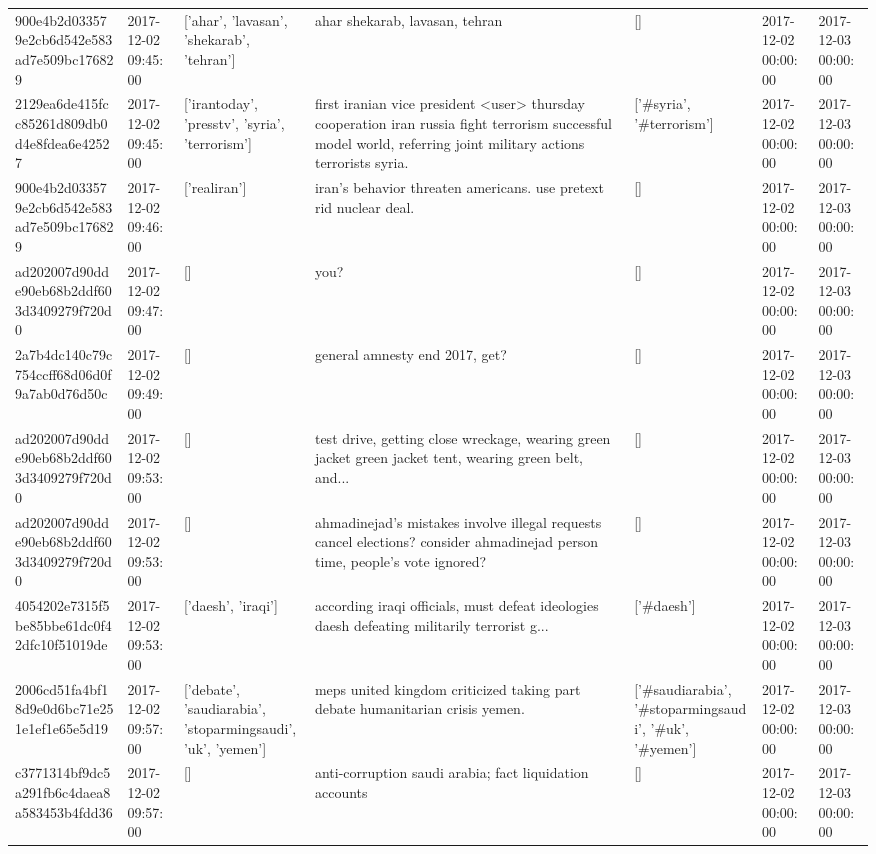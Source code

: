 \begin{tabular}{lllllll}
900e4b2d033579e2cb6d542e583ad7e509bc176829 & 2017-12-02 09:45:00 & ['ahar', 'lavasan', 'shekarab', 'tehran'] & ahar shekarab, lavasan, tehran & [] & 2017-12-02 00:00:00 & 2017-12-03 00:00:00 \\
2129ea6de415fcc85261d809db0d4e8fdea6e42527 & 2017-12-02 09:45:00 & ['irantoday', 'presstv', 'syria', 'terrorism'] & first iranian vice president <user> thursday cooperation iran russia fight terrorism successful model world, referring joint military actions terrorists syria. & ['#syria', '#terrorism'] & 2017-12-02 00:00:00 & 2017-12-03 00:00:00 \\
900e4b2d033579e2cb6d542e583ad7e509bc176829 & 2017-12-02 09:46:00 & ['realiran'] & iran's behavior threaten americans. use pretext rid nuclear deal. & [] & 2017-12-02 00:00:00 & 2017-12-03 00:00:00 \\
ad202007d90dde90eb68b2ddf603d3409279f720d0 & 2017-12-02 09:47:00 & [] & you? & [] & 2017-12-02 00:00:00 & 2017-12-03 00:00:00 \\
2a7b4dc140c79c754ccff68d06d0f9a7ab0d76d50c & 2017-12-02 09:49:00 & [] & general amnesty end 2017, get? & [] & 2017-12-02 00:00:00 & 2017-12-03 00:00:00 \\
ad202007d90dde90eb68b2ddf603d3409279f720d0 & 2017-12-02 09:53:00 & [] & test drive, getting close wreckage, wearing green jacket green jacket tent, wearing green belt, and... & [] & 2017-12-02 00:00:00 & 2017-12-03 00:00:00 \\
ad202007d90dde90eb68b2ddf603d3409279f720d0 & 2017-12-02 09:53:00 & [] & ahmadinejad's mistakes involve illegal requests cancel elections? consider ahmadinejad person time, people's vote ignored? & [] & 2017-12-02 00:00:00 & 2017-12-03 00:00:00 \\
4054202e7315f5be85bbe61dc0f42dfc10f51019de & 2017-12-02 09:53:00 & ['daesh', 'iraqi'] & according iraqi officials, must defeat ideologies daesh defeating militarily terrorist g... & ['#daesh'] & 2017-12-02 00:00:00 & 2017-12-03 00:00:00 \\
2006cd51fa4bf18d9e0d6bc71e251e1ef1e65e5d19 & 2017-12-02 09:57:00 & ['debate', 'saudiarabia', 'stoparmingsaudi', 'uk', 'yemen'] & meps united kingdom criticized taking part debate humanitarian crisis yemen. & ['#saudiarabia', '#stoparmingsaudi', '#uk', '#yemen'] & 2017-12-02 00:00:00 & 2017-12-03 00:00:00 \\
c3771314bf9dc5a291fb6c4daea8a583453b4fdd36 & 2017-12-02 09:57:00 & [] & anti-corruption saudi arabia; fact liquidation accounts & [] & 2017-12-02 00:00:00 & 2017-12-03 00:00:00 \\

\end{tabular}

